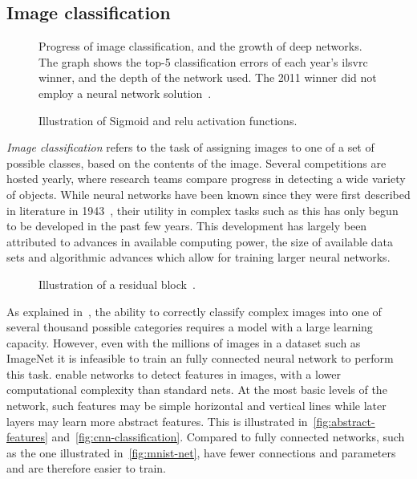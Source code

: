 \documentclass[\rootfolder/main.tex]{subfiles}
\begin{document}
\subsection{Image classification}

\begin{figure}
    \caption[The influence of deep learning on image classification error rates.]%
            {Progress of image classification, and the growth of deep networks. %
            The graph shows the top-5 classification errors of each year's \acrshort{ilsvrc} winner, and the depth of the network used. %
            The 2011 winner did not employ a neural network solution~\cite{Krizhevsky2012}\cite{Zeiler2013}\cite{Szegedy2014}\cite{He2016}.}
    \label{fig:ilsvrc}
\end{figure}

\begin{wrapfigure}{R}{0.5\columnwidth}
    \caption{Illustration of Sigmoid and \acrshort{relu} activation functions.}
    \label{fig:activation-functions}
\end{wrapfigure}

\emph{Image classification} refers to the task of assigning images to one of a set of possible classes, based on the contents of the image.
Several competitions are hosted yearly, where research teams compare progress in detecting a wide variety of objects.
While neural networks have been known since they were first described in literature in 1943~\cite{Mitchell1997}\cite{Mcculloch1943}, their utility in complex tasks such as this has only begun to be developed in the past few years.
This development has largely been attributed to advances in available computing power, the size of available data sets and algorithmic advances which allow for training larger neural networks.

\begin{wrapfigure}{R}{0.5\columnwidth}
    \caption[Illustration of a residual block.]{Illustration of a residual block~\cite{He2016}.}
    \label{fig:residual-block}
\end{wrapfigure}

As explained in~\cite{Krizhevsky2012}, the ability to correctly classify complex images into one of several thousand possible categories requires a model with a large learning capacity.
However, even with the millions of images in a dataset such as ImageNet it is infeasible to train an fully connected neural network to perform this task.
 enable networks to detect features in images, with a lower computational complexity than standard nets.
At the most basic levels of the network, such features may be simple horizontal and vertical lines while later layers may learn more abstract features.
This is illustrated in~\cref{fig:abstract-features} and~\cref{fig:cnn-classification}.
Compared to fully connected networks, such as the one illustrated in~\cref{fig:mnist-net},  have fewer connections and parameters and are therefore easier to train.
\end{document}

